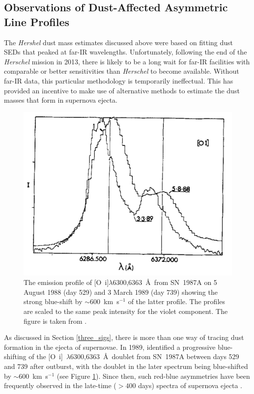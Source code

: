  \subsection{Observations of Dust-Affected Asymmetric Line Profiles}

The {\em Hershel} dust mass estimates discussed above were based on fitting dust SEDs that peaked at far-IR wavelengths. Unfortunately, following the end of the {\em Herschel} mission in 2013, there is likely to be a long wait for far-IR facilities with comparable or better sensitivities than {\em Herschel} to become available.  Without far-IR data, this particular methodology is temporarily ineffectual.  This has provided an incentive to make use of alternative methods to estimate the dust masses that form in supernova ejecta.

\begin{figure}
\centering
\includegraphics[clip=true,scale=0.45,trim= 0 0 0 0,angle=1]{chapters/chapter1/figs/LucyOI.png}
\caption{The emission profile of [O~{\sc i}]$\lambda$6300,6363~\AA\ from SN~1987A on 5 August 1988 (day 529) and 3 March 1989 (day 739) showing the strong blue-shift by $\sim600 $~km~s$^{-1}$ of the latter profile.  The profiles are scaled to the same peak intensity for the violet component.  The figure is taken from \citet{Lucy1989}.}
\label{fig:Lucy_orig}
\end{figure}


As discussed in Section \ref{three_sigs}, there is more than one way of tracing dust formation in the ejecta of supernovae.  In 1989, \citeauthor{Lucy1989} identified a progressive blue-shifting of the [O~{\sc i}]~$\lambda$6300,6363~\AA\ doublet from SN~1987A between days 529 and 739 after outburst, with the doublet in the later spectrum being blue-shifted by $\sim600 $~km~s$^{-1}$ (see Figure \ref{fig:Lucy_orig}). Since then, such red-blue asymmetries have been frequently observed in the late-time ($ > 400$ days) spectra of supernova ejecta  .

